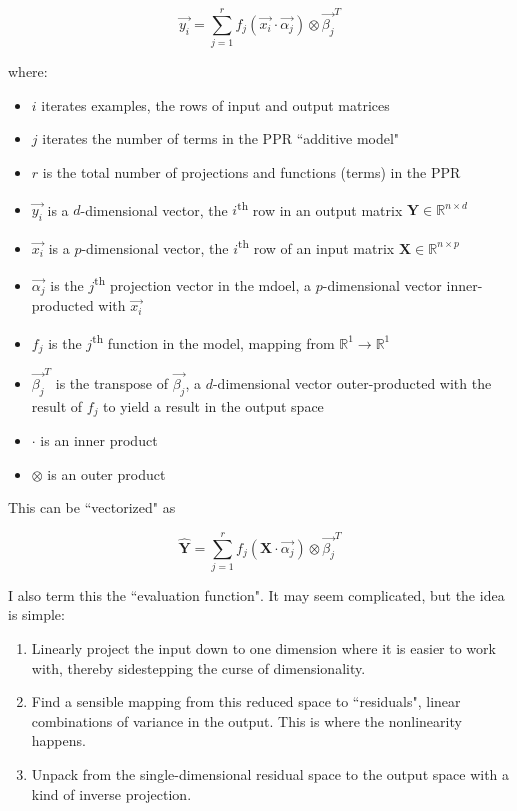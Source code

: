 \documentclass[12pt]{article}
\begin{document}
$$\vec{y_i} = \sum_{j=1}^{r} f_j(\vec{x_i} \cdot \vec{\alpha_j}) \otimes \vec{\beta_j}^T$$

where:
\begin{itemize}
	\setlength\itemsep{-2mm}
	\item $i$ iterates examples, the rows of input and output matrices
	\item $j$ iterates the number of terms in the PPR ``additive model"
	\item $r$ is the total number of projections and functions (terms) in the PPR
	\item $\vec{y_i}$ is a $d$-dimensional vector, the $i$\textsuperscript{th} row in an output matrix $\pmb{Y} \in \mathbb{R}^{n \times d}$
	\item $\vec{x_i}$ is a $p$-dimensional vector, the $i$\textsuperscript{th} row of an input matrix $\pmb{X} \in \mathbb{R}^{n \times p}$
	\item $\vec{\alpha_j}$ is the $j$\textsuperscript{th} projection vector in the mdoel, a $p$-dimensional vector inner-producted with $\vec{x_i}$
	\item $f_j$ is the $j$\textsuperscript{th} function in the model, mapping from $\mathbb{R}^1 \rightarrow \mathbb{R}^1$
	\item $\vec{\beta_j}^T$ is the transpose of $\vec{\beta_j}$, a $d$-dimensional vector outer-producted with the result of $f_j$ to yield a result in the output space
	\item $\cdot$ is an inner product
	\item $\otimes$ is an outer product
\end{itemize}

This can be ``vectorized" as

$$\pmb{\hat{Y}} = \sum_{j=1}^r f_j(\pmb{X} \cdot \vec{\alpha_j}) \otimes \vec{\beta_j}^T$$

I also term this the ``evaluation function". It may seem complicated, but the idea is simple:

\begin{enumerate}
	\setlength\itemsep{-2mm}
	\item Linearly project the input down to one dimension where it is easier to work with, thereby sidestepping the curse of dimensionality.
	\item Find a sensible mapping from this reduced space to ``residuals", linear combinations of variance in the output. This is where the nonlinearity happens.
	\item Unpack from the single-dimensional residual space to the output space with a kind of inverse projection.
\end{enumerate}
\end{document}
